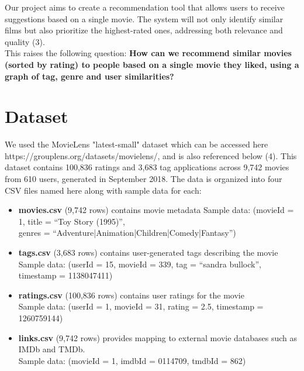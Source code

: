 \documentclass[fontsize=11pt]{article}
\begin{document}
Our project aims to create a recommendation tool that allows users to receive suggestions based on a single movie. The system will not only identify similar films but also prioritize the highest-rated ones, addressing both relevance and quality (3).\\ 

This raises the following question: \textbf{How can we recommend similar movies (sorted by rating) to people based on a single movie they liked, using a graph of tag, genre and user similarities?} \\

\section*{Dataset}
We used the MovieLens "latest-small" dataset which can be accessed here https://grouplens.org/datasets/movielens/, and is also referenced below (4). This dataset contains 100,836 ratings and 3,683 tag applications across 9,742 movies from 610 users, generated in September 2018. The data is organized into four CSV files named here along with sample data for each: 
\begin{itemize}
    \item \textbf{movies.csv} (9,742 rows) contains movie metadata
    Sample data: (movieId = 1, title = ``Toy Story (1995)'', \\
    genres = ``Adventure|Animation|Children|Comedy|Fantasy'')

    \item \textbf{tags.csv} (3,683 rows) contains user-generated tags describing the movie
    \\
    Sample data: (userId = 15, movieId = 339, tag = ``sandra bullock'', 
    timestamp = 1138047411)

    \item \textbf{ratings.csv} (100,836 rows) contains user ratings for the movie
    \\
    Sample data: (userId = 1, movieId = 31, rating = 2.5, timestamp = 1260759144)

    \item \textbf{links.csv} (9,742 rows) provides mapping to external movie databases such as IMDb and TMDb.
    \\
    Sample data: (movieId = 1, imdbId = 0114709, tmdbId = 862) \\
\end{itemize}
\end{document}
